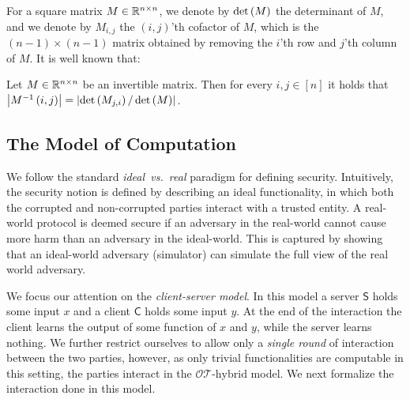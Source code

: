 \documentclass{llncs}
\newcommand{\OTfunc}{\mathcal{OT}}
\newcommand{\OThybrid}{\OTfunc\mbox{-}\text{hybrid}}
\renewcommand{\det}[1]{\operatorname{det}\of{#1}}
\renewcommand{\Sc}{\mathsf{S}}
\newcommand{\Cc}{\mathsf{C}}
\begin{document}
For a square matrix $M\in{\mathbb R}^{n\times n}$, we denote by $\det{M}$ the determinant of $M$, and we denote by $M_{i,j}$ the $(i,j)$'th cofactor of $M$, which is the $(n-1)\times(n-1)$ matrix obtained by removing the $i$'th row and $j$'th column of $M$.
It is well known that:
\begin{fact}\label{fact-cramer}
Let $M\in{\mathbb R}^{n\times n}$ be an invertible matrix. Then for every $i,j\in[n]$ it holds that $\abs{M^{-1}\of{i,j}}=\abs{\det{M_{j,i}}/\det{M}}$.
\end{fact}

\subsection{The Model of Computation}
We follow the standard \emph{ideal~vs.~real} paradigm for defining security. Intuitively, the security notion is defined by describing an ideal functionality, in which both the corrupted and non-corrupted parties interact with a trusted entity. A real-world protocol is deemed secure if an adversary in the real-world cannot cause more harm than an adversary in the ideal-world. This is captured by showing that an ideal-world adversary (simulator) can simulate the full view of the real world adversary. 

 We focus our attention on the \emph{client-server model}. In this model a server $\Sc$ holds some input $x$ and a client $\Cc$ holds some input $y$. At the end of the interaction the client learns the output of some function of $x$ and $y$, while the server learns nothing. We further restrict ourselves to allow only a \emph{single round} of interaction between the two parties, however, as only trivial functionalities are computable in this setting, the parties interact in the $\OThybrid$ model. 
We next formalize the interaction done in this model.
\end{document}
